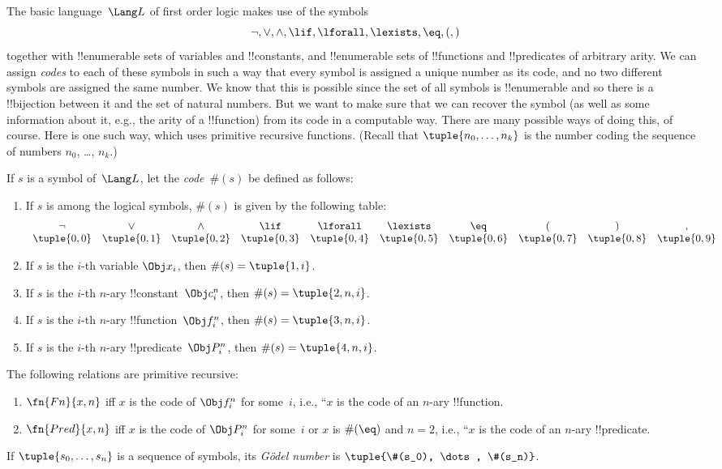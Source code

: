 \documentclass[../../include/open-logic-section]{subfiles}
\begin{document}

The basic language~$\Lang L$ of first order logic makes use of the symbols
\[
\lnot, \lor, \land, \lif, \lforall, \lexists, \eq, (, )
\]
together with !!{enumerable} sets of variables and !!{constant}s, and
!!{enumerable} sets of !!{function}s and !!{predicate}s of arbitrary
arity.  We can assign \emph{codes} to each of these symbols in such a
way that every symbol is assigned a unique number as its code, and no
two different symbols are assigned the same number.  We know that this
is possible since the set of all symbols is !!{enumerable} and so
there is a !!{bijection} between it and the set of natural numbers.
But we want to make sure that we can recover the symbol (as well as
some information about it, e.g., the arity of a !!{function}) from its
code in a computable way.  There are many possible ways of doing this,
of course.  Here is one such way, which uses primitive recursive
functions.  (Recall that $\tuple{n_0, \dots, n_k}$ is the number
coding the sequence of numbers $n_0$, \dots, $n_k$.)

\begin{defn}
If $s$ is a symbol of~$\Lang L$, let the \emph{code}~$\#(s)$ be
defined as follows:
\begin{enumerate}
\item If $s$ is among the logical symbols, $\#(s)$ is given by the
  following table:
\[
\begin{array}{cccccccccc}
\lnot & \lor & \land & \lif & \lforall & \lexists & \eq & ( & ) & ,\\
\tuple{0, 0} & \tuple{0, 1} & \tuple{0, 2} & \tuple{0, 3} & 
\tuple{0, 4} & \tuple{0, 5} & \tuple{0, 6} & \tuple{0, 7} &
\tuple{0, 8} & \tuple{0, 9} 
\end{array}
\]
\item If $s$ is the $i$-th variable $\Obj x_i$, then $\#(s) = \tuple{1, i}$.
\item If $s$ is the $i$-th $n$-ary !!{constant}~$\Obj c_i^n$, then
  $\#(s) = \tuple{2, n, i}$.
\item If $s$ is the $i$-th $n$-ary !!{function}~$\Obj f_i^n$, then
  $\#(s) = \tuple{3, n, i}$.
\item If $s$ is the $i$-th $n$-ary !!{predicate}~$\Obj P_i^n$, then
  $\#(s) = \tuple{4, n, i}$.
\end{enumerate}
\end{defn}

\begin{prop}
The following relations are primitive recursive:
\begin{enumerate}
\item $\fn{Fn}{x, n}$ iff $x$ is the code of $\Obj f^n_i$ for
  some~$i$, i.e., ``$x$ is the code of an $n$-ary !!{function}.
\item $\fn{Pred}{x, n}$ iff $x$ is the code of $\Obj P^n_i$ for
  some~$i$ or $x$ is $\#(\eq)$ and $n = 2$, i.e., ``$x$ is the code of
  an $n$-ary !!{predicate}.
\end{enumerate}
\end{prop}

\begin{defn}
If $\tuple{s_0, \dots, s_n}$ is a sequence of symbols, its
\emph{G\"odel number} is $\tuple{\#(s_0), \dots, \#(s_n)}$.
\end{defn}
\end{document}
